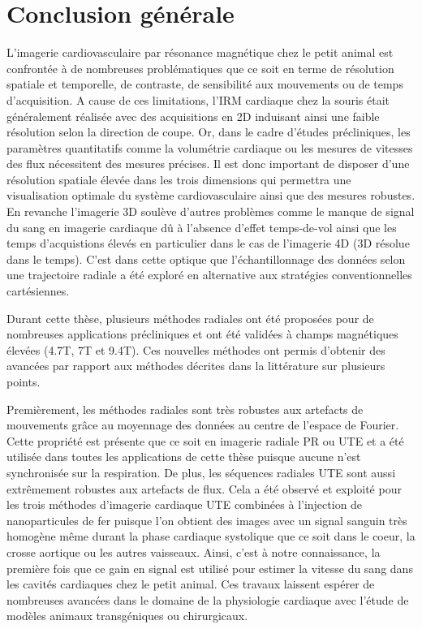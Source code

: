 \chapter{Conclusion générale}

\setlength{\footskip}{50pt}

L'imagerie cardiovasculaire par résonance magnétique chez le petit animal est confrontée à de nombreuses problématiques que ce soit en terme de résolution spatiale et temporelle, de contraste, de sensibilité aux mouvements ou de temps d'acquisition. A cause de ces limitations,  l'IRM cardiaque chez la souris était généralement réalisée avec des acquisitions en 2D induisant ainsi une faible résolution selon la direction de coupe. Or, dans le cadre d'études précliniques, les paramètres quantitatifs comme la volumétrie cardiaque ou les mesures de vitesses des flux nécessitent des mesures précises. Il est donc important de disposer d'une résolution spatiale élevée dans les trois dimensions qui permettra une visualisation optimale du système cardiovasculaire ainsi que des mesures robustes. 
En revanche l'imagerie 3D soulève d'autres problèmes comme le manque de signal du sang en imagerie cardiaque dû à l'absence d'effet temps-de-vol ainsi que les temps d'acquistions élevés en particulier dans le cas de l'imagerie 4D (3D résolue dans le temps).
C'est dans cette optique que l'échantillonnage des données selon une trajectoire radiale a été exploré en alternative aux stratégies conventionnelles cartésiennes. 
\medskip

Durant cette thèse, plusieurs méthodes radiales ont été proposées pour de nombreuses applications précliniques et ont été validées à champs magnétiques élevées (4.7T, 7T et 9.4T).
Ces nouvelles méthodes ont permis d'obtenir des avancées par rapport aux méthodes décrites dans la littérature sur plusieurs points.

Premièrement, les méthodes radiales sont très robustes aux artefacts de mouvements grâce au moyennage des données au centre de l'espace de Fourier. Cette propriété est présente que ce soit en imagerie radiale PR ou UTE et a été utilisée dans toutes les applications de cette thèse puisque aucune n'est synchronisée sur la respiration.
De plus, les séquences radiales UTE sont aussi extrêmement robustes aux artefacts de flux. Cela a été observé et exploité pour les trois méthodes d'imagerie cardiaque UTE combinées à l'injection de nanoparticules de fer puisque l'on obtient des images avec un signal sanguin très homogène même durant la phase cardiaque systolique que ce soit dans le coeur, la crosse aortique ou les autres vaisseaux. 
Ainsi, c'est à notre connaissance, la première fois que ce gain en signal est utilisé pour estimer la vitesse du sang dans les cavités cardiaques chez le petit animal. Ces travaux laissent espérer de nombreuses avancées dans le domaine de la physiologie cardiaque avec l'étude de modèles animaux transgéniques ou chirurgicaux.

